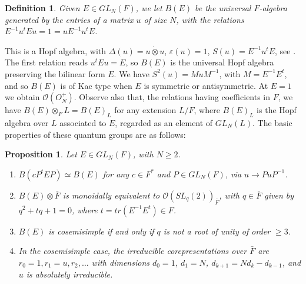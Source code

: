 \documentclass[11pt]{amsart}
\newtheorem{proposition}[theorem]{Proposition}
\newtheorem{definition}[theorem]{Definition}
\theoremstyle{definition}
\begin{document}
\begin{definition}
Given $E\in GL_N(F)$, we let $B(E)$ be the universal $F$-algebra generated by the entries of a matrix $u$ of size $N$, with the relations $E^{-1}u^tEu=1=uE^{-1}u^tE$.
\end{definition}

This is a Hopf algebra, with $\Delta(u)=u\dot\otimes u$, $\varepsilon(u)=1$, $S(u)=E^{-1}u^tE$, see \cite{bic,dla}. The first relation reads $u^tEu=E$, so $B(E)$ is the universal Hopf algebra preserving the bilinear form $E$. We have $S^2(u)=MuM^{-1}$, with $M=E^{-1}E^t$, and so $B(E)$ is of Kac type when $E$ is symmetric or antisymmetric. At $E=1$ we obtain $\mathcal O(O_N^+)$. Observe also that, the relations having coefficients in $F$, we have $B(E)\otimes_FL=B(E)_L$ for any extension $L/F$, where $B(E)_L$ is the Hopf algebra over $L$ associated to $E$, regarded as an element of $GL_N(L)$. The basic properties of these quantum groups are as follows:

\begin{proposition}
\label{p32}
Let $E\in GL_N(F)$, with $N\geq2$.
\begin{enumerate}
\item $B(cP^tEP)\simeq B(E)$ for any $c\in F^*$ and $P\in GL_N(F)$, via $u\to PuP^{-1}$.

\item $B(E)\otimes\bar F$ is monoidally equivalent to $\mathcal O(SL_q(2))_{\bar F}$, with $q\in\bar F$ given by $q^2+tq+1=0$, where $t=tr(E^{-1}E^t)\in F$.

\item $B(E)$ is cosemisimple if and only if $q$ is not a root of unity of order $\geq3$.

\item In the cosemisimple case, the irreducible corepresentations over $\bar F$ are $r_0=1,r_1=u,r_2,\ldots$ with dimensions $d_0=1$, $d_1=N$, $d_{k+1}=Nd_k-d_{k-1}$, and $u$ is absolutely irreducible.
\end{enumerate}
\end{proposition}
\end{document}
